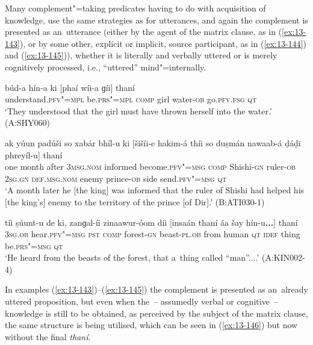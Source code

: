  Many complement"=taking predicates having to do with acquisition of knowledge, use the same strategies as for utterances, and again the complement is presented as an~utterance (either by the agent of the matrix clause, as in (\ref{ex:13-143}), or by some other, explicit or implicit, source participant, as in (\ref{ex:13-144}) and (\ref{ex:13-145})), whether it is literally and verbally uttered or is merely cognitively processed, i.e., ``uttered'' mind"=internally. 

\begin{exe}
\ex
\label{ex:13-143}
\gll \label{bkm:Ref190835538}búd-a hín-a ki [phaí wíi-a  ɡíi] thaní \\
understand.\textsc{pfv"=mpl} be.\textsc{prs"=mpl} \textsc{comp} girl water-\textsc{ob} go.\textsc{pfv.fsg} \textsc{qt} \\
\glt `They understood that the girl must have thrown herself into the water.' (A:SHY060)

\ex
\label{ex:13-144}
\gll ak yúun padúši so xabár bhíl-u  ki [šišíi-e hakim-á thíi so
  duṣmán nawaab-á  ḍáḍi phreyíl-u] thaní \\
one month after \textsc{3msg.nom} informed become.\textsc{pfv"=msg}  \textsc{comp} Shishi-\textsc{gn} ruler-\textsc{ob } \textsc{2sg.gn} \textsc{def.msg.nom} enemy prince-\textsc{ob} side send.\textsc{pfv"=msg} \textsc{qt}  \\
\glt `A month later he [the king] was informed that the ruler of Shishi had helped his [the king's] enemy to the territory of the prince [of Dir].' (B:ATI030-1)

\ex
\label{ex:13-145}
\gll \label{bkm:Ref190835565}tíi ṣúunt-u de ki, zanɡal-íi zinaawur-óom  díi [insaán thaní áa šay hín-u\textbf{...}] thaní \\
\textsc{3sg.ob} hear.\textsc{pfv"=msg} \textsc{pst} \textsc{comp} forest-\textsc{gn} beast-\textsc{pl.ob}  from human \textsc{qt} \textsc{idef} thing be.\textsc{prs"=msg} \textsc{qt} \\
\glt `He heard from the beasts of the forest, that a~thing called ``man''....' (A:KIN002-4) 
\end{exe}

In examples (\ref{ex:13-143})--(\ref{ex:13-145}) the complement is presented as an~already uttered proposition, but even when the~-- assumedly verbal or cognitive~-- knowledge is still to be obtained, as perceived by the subject of the matrix clause, the same structure is being utilised, which can be seen in (\ref{ex:13-146}) but now without the final \textit{thaní}. 


